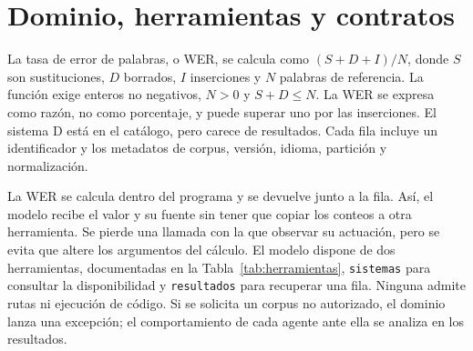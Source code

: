 \section{Dominio, herramientas y contratos}

La tasa de error de palabras, o WER, se calcula como $(S+D+I)/N$, donde $S$ son sustituciones, $D$ borrados, $I$ inserciones y $N$ palabras de referencia. La función exige enteros no negativos, $N>0$ y $S+D\le N$. La WER se expresa como razón, no como porcentaje, y puede superar uno por las inserciones. El sistema D está en el catálogo, pero carece de resultados. Cada fila incluye un identificador y los metadatos de corpus, versión, idioma, partición y normalización.

La WER se calcula dentro del programa y se devuelve junto a la fila. Así, el modelo recibe el valor y su fuente sin tener que copiar los conteos a otra herramienta. Se pierde una llamada con la que observar su actuación, pero se evita que altere los argumentos del cálculo. El modelo dispone de dos herramientas, documentadas en la Tabla~\ref{tab:herramientas}, \texttt{sistemas} para consultar la disponibilidad y \texttt{resultados} para recuperar una fila. Ninguna admite rutas ni ejecución de código. Si se solicita un corpus no autorizado, el dominio lanza una excepción; el comportamiento de cada agente ante ella se analiza en los resultados.


